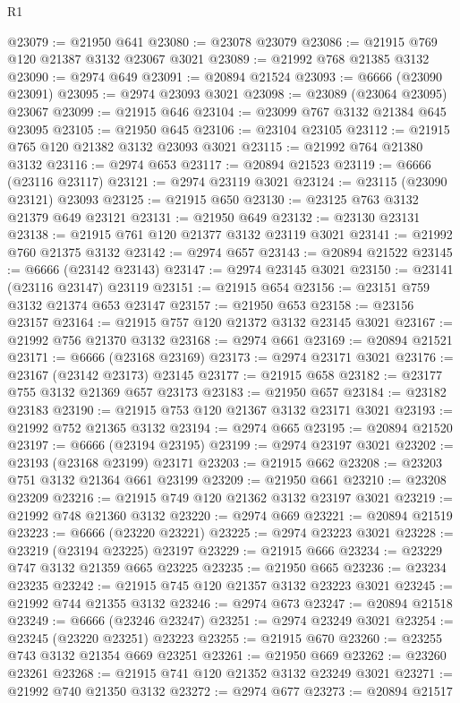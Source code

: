 \begin{lexlean}{R1}
\begin{coremodule}
@23079 := @21950 @641
@23080 := @23078 @23079
@23086 := @21915 @769 @120 @21387 @3132 @23067 @3021
@23089 := @21992 @768 @21385 @3132
@23090 := @2974 @649
@23091 := @20894 @21524
@23093 := @6666 (@23090 @23091)
@23095 := @2974 @23093 @3021
@23098 := @23089 (@23064 @23095) @23067
@23099 := @21915 @646
@23104 := @23099 @767 @3132 @21384 @645 @23095
@23105 := @21950 @645
@23106 := @23104 @23105
@23112 := @21915 @765 @120 @21382 @3132 @23093 @3021
@23115 := @21992 @764 @21380 @3132
@23116 := @2974 @653
@23117 := @20894 @21523
@23119 := @6666 (@23116 @23117)
@23121 := @2974 @23119 @3021
@23124 := @23115 (@23090 @23121) @23093
@23125 := @21915 @650
@23130 := @23125 @763 @3132 @21379 @649 @23121
@23131 := @21950 @649
@23132 := @23130 @23131
@23138 := @21915 @761 @120 @21377 @3132 @23119 @3021
@23141 := @21992 @760 @21375 @3132
@23142 := @2974 @657
@23143 := @20894 @21522
@23145 := @6666 (@23142 @23143)
@23147 := @2974 @23145 @3021
@23150 := @23141 (@23116 @23147) @23119
@23151 := @21915 @654
@23156 := @23151 @759 @3132 @21374 @653 @23147
@23157 := @21950 @653
@23158 := @23156 @23157
@23164 := @21915 @757 @120 @21372 @3132 @23145 @3021
@23167 := @21992 @756 @21370 @3132
@23168 := @2974 @661
@23169 := @20894 @21521
@23171 := @6666 (@23168 @23169)
@23173 := @2974 @23171 @3021
@23176 := @23167 (@23142 @23173) @23145
@23177 := @21915 @658
@23182 := @23177 @755 @3132 @21369 @657 @23173
@23183 := @21950 @657
@23184 := @23182 @23183
@23190 := @21915 @753 @120 @21367 @3132 @23171 @3021
@23193 := @21992 @752 @21365 @3132
@23194 := @2974 @665
@23195 := @20894 @21520
@23197 := @6666 (@23194 @23195)
@23199 := @2974 @23197 @3021
@23202 := @23193 (@23168 @23199) @23171
@23203 := @21915 @662
@23208 := @23203 @751 @3132 @21364 @661 @23199
@23209 := @21950 @661
@23210 := @23208 @23209
@23216 := @21915 @749 @120 @21362 @3132 @23197 @3021
@23219 := @21992 @748 @21360 @3132
@23220 := @2974 @669
@23221 := @20894 @21519
@23223 := @6666 (@23220 @23221)
@23225 := @2974 @23223 @3021
@23228 := @23219 (@23194 @23225) @23197
@23229 := @21915 @666
@23234 := @23229 @747 @3132 @21359 @665 @23225
@23235 := @21950 @665
@23236 := @23234 @23235
@23242 := @21915 @745 @120 @21357 @3132 @23223 @3021
@23245 := @21992 @744 @21355 @3132
@23246 := @2974 @673
@23247 := @20894 @21518
@23249 := @6666 (@23246 @23247)
@23251 := @2974 @23249 @3021
@23254 := @23245 (@23220 @23251) @23223
@23255 := @21915 @670
@23260 := @23255 @743 @3132 @21354 @669 @23251
@23261 := @21950 @669
@23262 := @23260 @23261
@23268 := @21915 @741 @120 @21352 @3132 @23249 @3021
@23271 := @21992 @740 @21350 @3132
@23272 := @2974 @677
@23273 := @20894 @21517

\end{coremodule}
\end{lexlean}
